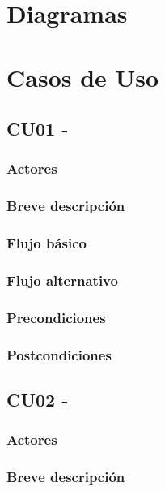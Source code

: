\documentclass[12pt, a4paper, titlepage]{article}
\begin{document}
\begin{description}
	
	
\end{description}
          
\clearpage
\section{Diagramas}





\section{Casos de Uso}
\subsection{CU01 -}
\subsubsection{Actores}
\subsubsection{Breve descripción}
\subsubsection{Flujo básico}
\subsubsection{Flujo alternativo}
\subsubsection{Precondiciones}
\subsubsection{Postcondiciones}


\subsection{CU02 -}
\subsubsection{Actores}
\subsubsection{Breve descripción}
\end{document}
